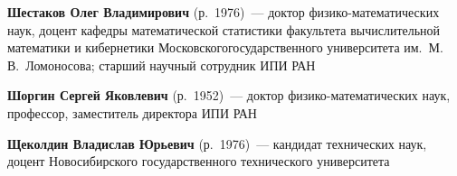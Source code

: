 \begin{multicols}{2}
\vspace*{4pt}

\noindent
\textbf{Шестаков Олег Владимирович} (р.\ 1976)~--- доктор фи\-зи\-ко-ма\-те\-ма\-ти\-че\-ских 
наук, доцент кафедры математической статистики факультета вычислительной математики и кибернетики 
Московского\linebreak государственного университета им.\ М.\,В.~Ломоносова; 
старший научный сотрудник ИПИ РАН


\vspace*{4pt}



\noindent
\textbf{Шоргин Сергей Яковлевич} (р.\ 1952)~--- доктор фи\-зи\-ко-ма\-те\-ма\-ти\-че\-ских наук, 
профессор,  заместитель директора ИПИ РАН

\vspace*{4pt}

\noindent
\textbf{Щеколдин Владислав Юрьевич} (р.\ 1976)~--- кандидат технических наук, 
доцент Новосибирского государственного технического университета
\def\leftkol{ОБ АВТОРАХ}
\def\rightkol{ОБ АВТОРАХ}







\end{multicols}

\newpage